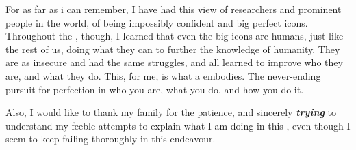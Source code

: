 
\let\defaultchapterheadstartvskip\chapterheadstartvskip
\renewcommand{\dropchapter}[1]{
  \renewcommand{\chapterheadstartvskip}{\vspace{#1}}
}
\renewcommand{\undodrop}[0]{
  \renewcommand{\chapterheadstartvskip}{\defaultchapterheadstartvskip}
}

\dropchapter{2.5cm}

\setlength\epigraphwidth{7cm}

\undodrop

For as far as i can remember, I have had this view of researchers and prominent people in the world, of being impossibly confident and big perfect icons.
Throughout the \phd, though, I learned that even the big icons are humans, just like the rest of us, doing what they can to further the knowledge of humanity. 
They are as insecure and had the same struggles, and all learned to improve who they are, and what they do.
This, for me, is what a \phd embodies.
The never-ending pursuit for perfection in who you are, what you do, and how you do it.

Also, I would like to thank my family for the patience, and sincerely \textit{\textbf{trying}} to understand my feeble attempts to explain what I am doing in this \phd, even though I seem to keep failing thoroughly in this endeavour.




